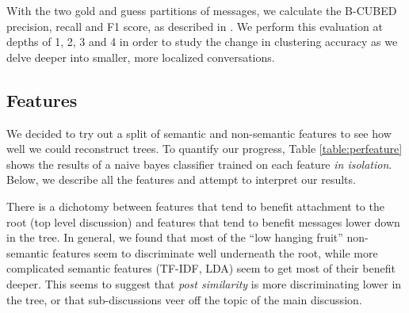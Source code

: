 \documentclass{article}
\begin{document}
With the two gold and guess partitions of messages, we calculate the B-CUBED
precision, recall and F1 score, as described in . We perform
this evaluation at depths of 1, 2, 3 and 4 in order to study the change in
clustering accuracy as we delve deeper into smaller, more localized
conversations.

\subsection{Features}
\label{sec:features}
We decided to try out a split of semantic and non-semantic features to see how
well we could reconstruct trees. To quantify our progress, Table
\ref{table:perfeature} shows the results of a naive bayes classifier trained on
each feature \textit{in isolation}. Below, we describe all the features and
attempt to interpret our results. 

There is a dichotomy between features that tend to benefit attachment to the
root (top level discussion) and features that tend to benefit messages lower
down in the tree. In general, we found that most of the ``low hanging fruit''
non-semantic features seem to discriminate well underneath the root, while
more complicated semantic features (TF-IDF, LDA) seem to get most of their
benefit deeper. This seems to suggest that \textit{post similarity} is more
discriminating lower in the tree, or that sub-discussions veer off the topic
of the main discussion.
\end{document}
